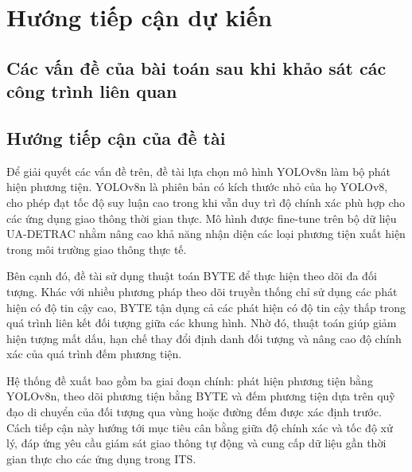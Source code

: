 \section{Hướng tiếp cận dự kiến}

\subsection{Các vấn đề của bài toán sau khi khảo sát các công trình liên quan}

\subsection{Hướng tiếp cận của đề tài}

Để giải quyết các vấn đề trên, đề tài lựa chọn mô hình YOLOv8n làm bộ phát hiện
phương tiện. YOLOv8n là phiên bản có kích thước nhỏ của họ YOLOv8, cho phép đạt
tốc độ suy luận cao trong khi vẫn duy trì độ chính xác phù hợp cho các ứng dụng
giao thông thời gian thực. Mô hình được fine-tune trên bộ dữ liệu UA-DETRAC nhằm
nâng cao khả năng nhận diện các loại phương tiện xuất hiện trong môi trường giao
thông thực tế.

Bên cạnh đó, đề tài sử dụng thuật toán BYTE để thực hiện theo dõi đa đối
tượng. Khác với nhiều phương pháp theo dõi truyền thống chỉ sử dụng các phát
hiện có độ tin cậy cao, BYTE tận dụng cả các phát hiện có độ tin cậy thấp
trong quá trình liên kết đối tượng giữa các khung hình. Nhờ đó, thuật toán giúp
giảm hiện tượng mất dấu, hạn chế thay đổi định danh đối tượng và nâng cao độ
chính xác của quá trình đếm phương tiện.

Hệ thống đề xuất bao gồm ba giai đoạn chính: phát hiện phương tiện bằng
YOLOv8n, theo dõi phương tiện bằng BYTE và đếm phương tiện dựa trên quỹ
đạo di chuyển của đối tượng qua vùng hoặc đường đếm được xác định trước. Cách
tiếp cận này hướng tới mục tiêu cân bằng giữa độ chính xác và tốc độ xử lý,
đáp ứng yêu cầu giám sát giao thông tự động và cung cấp dữ liệu gần thời gian
thực cho các ứng dụng trong ITS.



